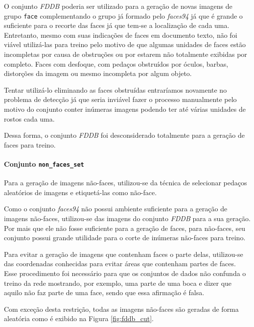 \documentclass[10pt, conference]{IEEEtran}
\begin{document}
				O conjunto \textit{FDDB} poderia ser utilizado para a geração de novas imagens de grupo \texttt{face} complementando o grupo já formado pelo \textit{faces94} já que é grande o suficiente para o recorte das faces já que tem-se a localização de cada uma. Entretanto, mesmo com suas indicações de faces em documento texto, não foi viável utilizá-las para treino pelo motivo de que algumas unidades de faces estão incompletas por causa de obstruções ou por estarem não totalmente exibidas por completo. Faces com desfoque, com pedaços obstruídos por óculos, barbas, distorções da imagem ou mesmo incompleta por algum objeto.
				
				Tentar utilizá-lo eliminando as faces obstruídas entraríamos novamente no problema de detecção já que seria inviável fazer o processo manualmente pelo motivo do conjunto conter inúmeras imagens podendo ter até várias unidades de rostos cada uma.
				
				Dessa forma, o conjunto \textit{FDDB} foi desconsiderado totalmente para a geração de faces para treino.
				

			\paragraph{Conjunto \texttt{non\_faces\_set}}
				Para a geração de imagens não-faces, utilizou-se da técnica de selecionar pedaços aleatórios de imagens e etiquetá-las como não-face.

				Como o conjunto \textit{faces94} não possui ambiente suficiente para a geração de imagens não-faces, utilizou-se das imagens do conjunto \textit{FDDB} para a sua geração. Por mais que ele não fosse suficiente para a geração de faces, para não-faces, seu conjunto possui grande utilidade para o corte de inúmeras não-faces para treino.

				Para evitar a geração de imagens que contenham faces o parte delas, utilizou-se das coordenadas conhecidas para evitar áreas que contenham partes de faces. Esse procedimento foi necessário para que os conjuntos de dados não confunda o treino da rede mostrando, por exemplo, uma parte de uma boca e dizer que aquilo não faz parte de uma face, sendo que essa afirmação é falsa.
				
				Com exceção desta restrição, todas as imagens não-faces são geradas de forma aleatória como é exibido na Figura \ref{fig:fddb_cut}.
\end{document}
